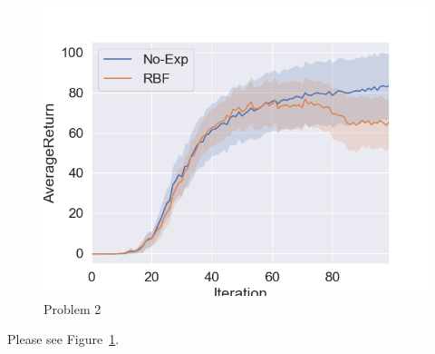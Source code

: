 \begin{figure}[htbp]
    \centering
    \includegraphics[width=0.5\linewidth]{figures/p2.png}
    \caption{Problem 2}
    \label{fig:p2}
\end{figure}

Please see Figure~\ref{fig:p2}. 
